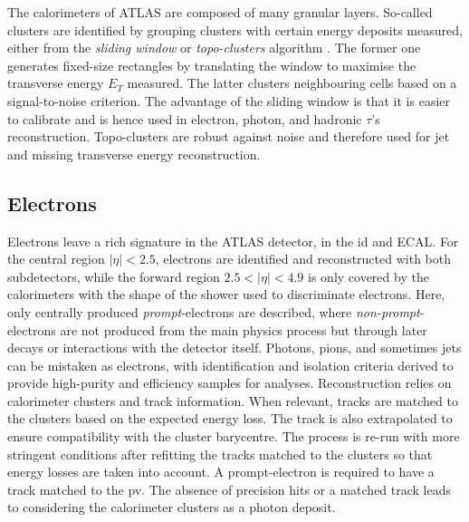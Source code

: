 The calorimeters of ATLAS are composed of many granular layers. So-called clusters are identified by grouping clusters with certain energy deposits measured, either from the \textit{sliding window} or \textit{topo-clusters} algorithm \cite{Lampl:1099735}. The former one generates fixed-size rectangles by translating the window to maximise the transverse energy $E_T$ measured. The latter clusters neighbouring cells based on a signal-to-noise criterion. The advantage of the sliding window is that it is easier to calibrate and is hence used in electron, photon, and hadronic $\tau$'s reconstruction. Topo-clusters are robust against noise and therefore used for jet and missing transverse energy reconstruction.

\subsection{Electrons}
Electrons leave a rich signature in the ATLAS detector, in the \gls{id} and ECAL. For the central region $|\eta| < 2.5$, electrons are identified and reconstructed with both subdetectors, while the forward region $2.5 < |\eta| < 4.9$ is only covered by the calorimeters with the shape of the shower used to discriminate electrons. Here, only centrally produced \textit{prompt}-electrons are described, where \textit{non-prompt}-electrons are not produced from the main physics process but through later decays or interactions with the detector itself. Photons, pions, and sometimes jets can be mistaken as electrons, with identification and isolation criteria derived to provide high-purity and efficiency samples for analyses. Reconstruction relies on calorimeter clusters and track information. When relevant, tracks are matched to the clusters based on the expected energy loss. The track is also extrapolated to ensure compatibility with the cluster barycentre. The process is re-run with more stringent conditions after refitting the tracks matched to the clusters so that energy losses are taken into account. A prompt-electron is required to have a track matched to the \gls{pv}. The absence of precision hits or a matched track leads to considering the calorimeter clusters as a photon deposit. \\


